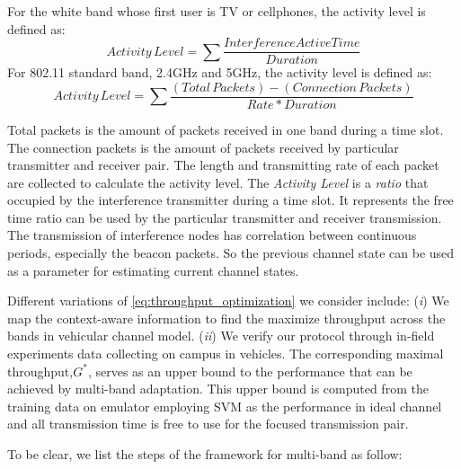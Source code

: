 For the white band whose first user is TV or cellphones, the activity level is defined as:
\begin{equation}
\label{equation:non802 Activity Level}
Activity\,Level = \sum{\frac{Interference Active Time}{Duration}}
\end{equation}
For 802.11 standard band, 2.4GHz and 5GHz, the activity level is defined as:
\begin{equation}
\label{equation:802 Activity Level}
Activity\,Level = \sum{\frac{(Total\, Packets)-(Connection\, Packets)}{Rate*Duration}}
\end{equation}

Total packets is the amount of packets received in one band during a time slot.
The connection packets is the amount of packets received by particular transmitter and receiver pair. 
The length and transmitting rate of each packet are collected to calculate the activity level.
The \emph{Activity Level} is a \emph{ratio} that occupied by the interference transmitter during a time slot. 
It represents the free time ratio can be used by the particular transmitter and receiver transmission. 
The transmission of interference nodes has correlation between continuous periods, especially the beacon packets. So the previous channel state can be used as a parameter for estimating current channel states.



Different variations of \ref{eq:throughput_optimization} we consider include: 
(\emph{i}) We map the context-aware information to find the maximize throughput across the bands in vehicular channel model.
(\emph{ii}) We verify our protocol through in-field experiments data collecting on campus in vehicles. 
The corresponding maximal throughput,$G^*$, serves as an upper bound to the performance that can be achieved by multi-band adaptation. 
This upper bound is computed from the training data on emulator employing SVM as the performance in ideal channel and all transmission time is free to use for the focused transmission pair.



To be clear, we list the steps of the framework for multi-band as follow:

